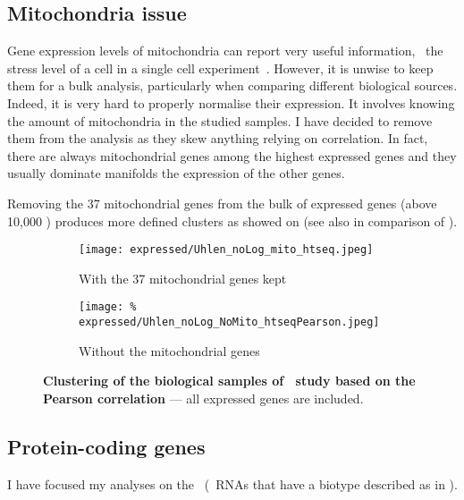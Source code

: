 \subsection{Mitochondria issue}\label{subsec:mito}

Gene expression levels of mitochondria can report very useful information,
\eg\ the stress level of a cell in a single cell experiment~.
However, it is unwise to keep them for a bulk analysis, particularly when
comparing different biological sources.
Indeed, it is very hard to properly normalise their expression.
It involves knowing the amount of mitochondria in the studied samples.
I have decided to remove them from the analysis as they skew anything relying
on correlation.
In fact, there are always mitochondrial genes among the highest expressed genes
and they usually dominate manifolds the expression of the other genes.

Removing the 37 mitochondrial genes from the bulk of expressed genes
(above 10,000 \pcgs) produces more defined clusters as showed on
 (see also  in comparison
of ).

\begin{figure}[!htbp]
    \centering
    \begin{subfigure}[hp]{0.85\textwidth}
        \centering
        \texttt{[image: expressed/Uhlen\_noLog\_mito\_htseq.jpeg]}
        \caption{With the 37 mitochondrial genes kept}\label{fig:withMito}
    \end{subfigure}

    \begin{subfigure}[hp]{0.85\textwidth}
        \centering
        \texttt{[image: \%
            expressed/Uhlen\_noLog\_NoMito\_htseqPearson.jpeg]}
        \caption{Without the mitochondrial genes}\label{fig:NoMito}
    \end{subfigure}
    \caption[Clustering of the biological samples of \uhlen\
    dataset based on the Pearson correlation]{\label{fig:MitoNomito}\textbf{Clustering
    of the biological samples of \uhlen\ study based on the Pearson correlation}
    --- all expressed genes are included.}
\end{figure}

\subsection{Protein-coding genes}\label{subsec:protcodingOnly}
I have focused my analyses on the \mRNAs\ (\ie\ \glspl{RNA} that have a
biotype described as \emph{\pc} in \ens{76}).

